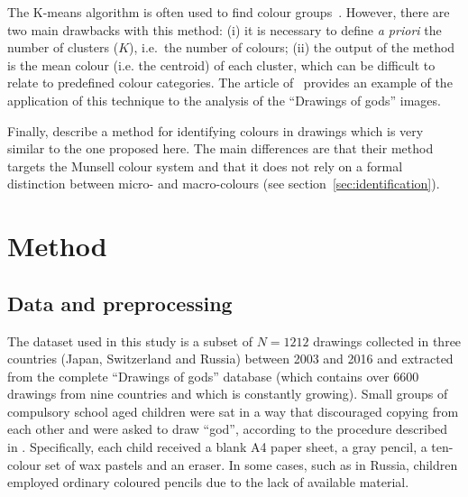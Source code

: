 \documentclass[11pt,a4paper]{article}
\begin{document}
The K-means algorithm is often used to find colour groups~\cite[see e.g.][]{yendrikhovskij2001,konyushkova2015,hulee2007}. However, there are two main drawbacks with this method: (i) it is necessary to define \textit{a priori} the number of clusters ($K$), i.e.~the number of colours; (ii) the output of the method is the mean colour (i.e. the centroid) of each cluster, which can be difficult to relate to predefined colour categories. The article of~\citet{konyushkova2015} provides an example of the application of this technique to the analysis of the ``Drawings of gods'' images.

Finally, \citet{kimbaelee2007} describe a method for identifying colours in drawings which is very similar to the one proposed here. The main differences are that their method targets the Munsell colour system \cite{Munsell1912} and that it does not rely on a formal distinction between micro- and macro-colours (see section~\ref{sec:identification}).


\section{Method}\label{methods}
\label{sec:method}

\subsection{Data and preprocessing}
\label{sec:dataset_preprocessing}

The dataset used in this study is a subset of $N = 1212$ drawings collected in three countries (Japan, Switzerland and Russia) between 2003 and 2016 and extracted from the complete ``Drawings of gods'' database (which contains over 6600 drawings from nine countries and which is constantly growing). Small groups of compulsory school aged children were sat in a way that discouraged copying from each other and were asked to draw ``god'', according to the procedure described in \citet{DandarovaRobertDessartSerbaevaEtAl2016}. Specifically, each child received a blank A4 paper sheet, a gray pencil, a ten-colour set of wax pastels and an eraser. In some cases, such as in Russia, children employed ordinary coloured pencils due to the lack of available material.
\end{document}
